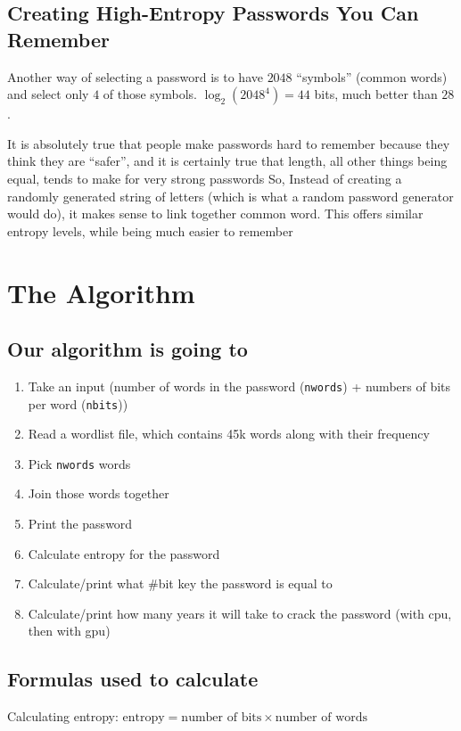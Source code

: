 \documentclass{scrartcl}
\begin{document}
\subsection{Creating High-Entropy Passwords You Can Remember}
\label{sec:orga55b5e6}
Another way of selecting a password is to have \(2048\) ``symbols'' (common words) and
select only \(4\) of those symbols. \(\log_{2}(2048^{4})=44\) bits, much better than \(28\).

It is absolutely true that people make passwords hard to remember because they
think they are ``safer'', and it is certainly true that length, all other things
being equal, tends to make for very strong passwords So, Instead of creating a
randomly generated string of letters (which is what a random password generator
would do), it makes sense to link together common word. This offers similar
entropy levels, while being much easier to remember

\section{The Algorithm}
\label{sec:org76d54f1}
\subsection{Our algorithm is going to}
\label{sec:orga6ec109}
\begin{enumerate}
\item Take an input (number of words in the password (\texttt{nwords}) + numbers of bits per
word (\texttt{nbits}))
\item Read a wordlist file, which contains 45k words along with their frequency
\item Pick \texttt{nwords} words
\item Join those words together
\item Print the password
\item Calculate entropy for the password
\item Calculate/print what \#bit key the password is equal to
\item Calculate/print how many years it will take to crack the password (with cpu,
then with gpu)
\end{enumerate}

\subsection{Formulas used to calculate}
\label{sec:orgc173721}
Calculating entropy:
\(\text{entropy}=\text{number of bits}\times\text{number of words}\)
\end{document}

